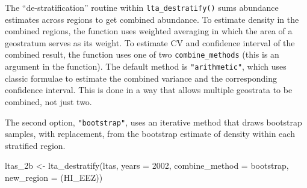 \documentclass[
]{book}
\newenvironment{Shaded}{\begin{snugshade}}{\end{snugshade}}
\newcommand{\AttributeTok}[1]{\textcolor[rgb]{0.77,0.63,0.00}{#1}}
\newcommand{\ConstantTok}[1]{\textcolor[rgb]{0.00,0.00,0.00}{#1}}
\newcommand{\DecValTok}[1]{\textcolor[rgb]{0.00,0.00,0.81}{#1}}
\newcommand{\FloatTok}[1]{\textcolor[rgb]{0.00,0.00,0.81}{#1}}
\newcommand{\FunctionTok}[1]{\textcolor[rgb]{0.00,0.00,0.00}{#1}}
\newcommand{\NormalTok}[1]{#1}
\newcommand{\OtherTok}[1]{\textcolor[rgb]{0.56,0.35,0.01}{#1}}
\newcommand{\SpecialCharTok}[1]{\textcolor[rgb]{0.00,0.00,0.00}{#1}}
\newcommand{\StringTok}[1]{\textcolor[rgb]{0.31,0.60,0.02}{#1}}
\begin{document}
The ``de-stratification'' routine within \texttt{lta\_destratify()} sums abundance estimates across regions to get combined abundance. To estimate density in the combined regions, the function uses weighted averaging in which the area of a geostratum serves as its weight. To estimate CV and confidence interval of the combined result, the function uses one of two \texttt{combine\_methods} (this is an argument in the function). The default method is \texttt{"arithmetic"}, which uses classic formulae to estimate the combined variance and the corresponding confidence interval. This is done in a way that allows multiple geostrata to be combined, not just two.

The second option, \texttt{"bootstrap"}, uses an iterative method that draws bootstrap samples, with replacement, from the bootstrap estimate of density within each stratified region.

\begin{Shaded}
\begin{Highlighting}[]
\NormalTok{ltas\_2b }\OtherTok{\textless{}{-}}
  \FunctionTok{lta\_destratify}\NormalTok{(ltas,}
               \AttributeTok{years =} \DecValTok{2002}\NormalTok{,}
               \AttributeTok{combine\_method =} \StringTok{\textquotesingle{}bootstrap\textquotesingle{}}\NormalTok{,}
               \AttributeTok{new\_region =} \StringTok{\textquotesingle{}(HI\_EEZ)\textquotesingle{}}\NormalTok{)}
\end{Highlighting}
\end{Shaded}

\begin{Shaded}
\end{Shaded}
\end{document}
